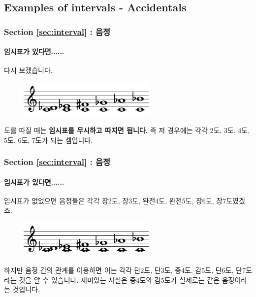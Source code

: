 \documentclass{beamer}
\begin{document}
	\subsection{Examples of intervals - Accidentals}
	\begin{frame}
		\frametitle{Section \ref{sec:interval} : 음정}
		\framesubtitle{임시표가 있다면......}
		다시 보겠습니다.
		\begin{figure}
			\centering
			\includegraphics[width=0.6\textwidth]{res/pdf/6/interval/etc.pdf}
		\end{figure}
		도를 따질 때는 {\bf 임시표를 무시하고 따지면 됩니다.} 즉 저 경우에는 각각 2도, 3도, 4도, 5도, 6도, 7도가 되는 셈입니다.
	\end{frame}
	
	\begin{frame}
		\frametitle{Section \ref{sec:interval} : 음정}
		\framesubtitle{임시표가 있다면......}
		임시표가 없었으면 음정들은 각각 장2도, 장3도, 완전4도, 완전5도, 장6도, 장7도였겠죠.
		\begin{figure}
			\centering
			\includegraphics[width=0.6\textwidth]{res/pdf/6/interval/etc.pdf}
		\end{figure}
		하지만 음정 간의 관계를 이용하면 이는 각각 단2도, 단3도, 증4도, 감5도, 단6도, 단7도라는 것을 알 수 있습니다. 재미있는 사실은 증4도와 감5도가 실제로는 같은 음정이라는 것입니다.
	\end{frame}
	
\end{document}
